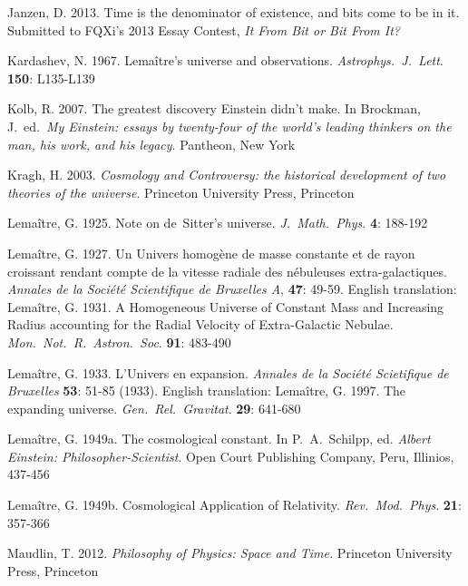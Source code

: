 \documentclass[12 pt]{article}
\begin{document}
\begin{thebibliography}{}
 Janzen, D. 2013. Time is the denominator of existence, and bits come to be in it. Submitted to FQXi’s 2013 Essay Contest, \textit{It From Bit or Bit From It?}

 Kardashev, N. 1967. Lema\^{i}tre's universe and observations. \textit{Astrophys.\ J.\ Lett}. \textbf{150}: L135-L139

 Kolb, R. 2007. The greatest discovery Einstein didn’t make. In Brockman, J.\ ed.\ \textit{My Einstein: essays by twenty-four of the world's leading thinkers on the man, his work, and his legacy}. Pantheon, New York 

 Kragh, H. 2003. \textit{Cosmology and Controversy: the historical development of two theories of the universe}. Princeton University Press, Princeton

 Lema\^{i}tre, G. 1925. Note on de~Sitter’s universe.\textit{ J.\ Math.\ Phys}. \textbf{4}: 188-192

 Lema\^{i}tre, G. 1927. Un Univers homog\`{e}ne de masse constante et de rayon croissant rendant compte de la vitesse radiale des nébuleuses extra-galactiques. \textit{Annales de la Soci\'{e}t\'{e} Scientifique de Bruxelles A}, \textbf{47}: 49-59. English translation: Lema\^{i}tre, G. 1931. A Homogeneous Universe of Constant Mass and Increasing Radius accounting for the Radial Velocity of Extra-Galactic Nebulae. \textit{Mon.\ Not.\ R.\ Astron.\ Soc}. \textbf{91}: 483-490

 Lema\^{i}tre, G. 1933. L'Univers en expansion. \textit{Annales de la Soci\'{e}t\'{e} Scietifique de Bruxelles} \textbf{53}: 51-85 (1933). English translation: Lema\^{i}tre, G. 1997. The expanding universe. \textit{Gen.\ Rel.\ Gravitat}. \textbf{29}: 641-680

 Lema\^{i}tre, G. 1949a. The cosmological constant. In P.\ A.\ Schilpp, ed. \textit{Albert Einstein: Philosopher-Scientist}. Open Court Publishing Company, Peru, Illinios, 437-456

 Lema\^{i}tre, G. 1949b. Cosmological Application of Relativity. \textit{Rev.\ Mod.\ Phys}. \textbf{21}: 357-366

 Maudlin, T. 2012. \textit{Philosophy of Physics: Space and Time.} Princeton University Press, Princeton


\end{thebibliography}
\end{document}

